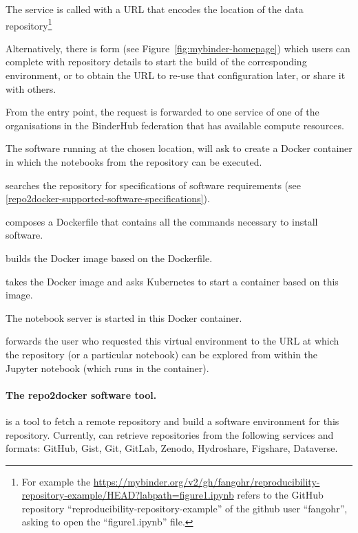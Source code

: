 \begin{compactitem}
\item The \mybinder{} service is called with a URL that encodes the location of the data
  repository\footnote{For example the 
    {\url{https://mybinder.org/v2/gh/fangohr/reproducibility-repository-example/HEAD?labpath=figure1.ipynb}}
    refers to the GitHub repository ``reproducibility-repository-example'' of the
    github user ``fangohr'', asking to open the ``figure1.ipynb'' file.}

  Alternatively, there is form (see Figure~\ref{fig:mybinder-homepage})
  which users can complete with repository details
  to start the build of the corresponding environment, or to obtain the URL to
  re-use that configuration later, or share it with others.
\item From the \mybinder{} entry point, the request is forwarded to one
  \binderhub{} service of one of the organisations in the BinderHub federation
  that has available compute resources.
\item The \binderhub{} software running at the chosen location, will ask
  \repotodocker{} to create a Docker container in which the notebooks from the repository can be executed.
\item \repotodocker{} searches the repository for specifications of software requirements (see \ref{repo2docker-supported-software-specifications}).
\item \repotodocker{} composes a Dockerfile that contains all the commands
  necessary to install software.
\item \repotodocker{} builds the Docker image based on the Dockerfile.
\item \binderhub{} takes the Docker image and asks Kubernetes to start 
  a container based on this image.
\item The notebook server is started in this Docker container.
\item \binderhub{} forwards the user who requested this virtual environment to
  the URL at which the repository (or a particular notebook) can be explored
  from within the Jupyter notebook (which runs in the container).
\end{compactitem}

\paragraph{The repo2docker software tool.}\label{sec:repo2docker}

\repotodocker{} is a tool to fetch a remote repository and build a software
environment for this repository. Currently, \repotodocker{} can retrieve
repositories from the following services and formats: GitHub, Gist, Git, GitLab,
Zenodo, Hydroshare, Figshare, Dataverse.

